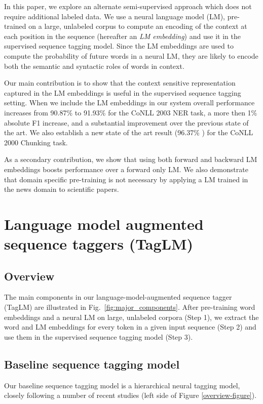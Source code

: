 \documentclass[11pt,a4paper]{article}
\begin{document}
In this paper, we explore an alternate semi-supervised approach which does not require additional labeled data.
We use a neural language model (LM), pre-trained on a large, unlabeled corpus to compute an encoding of the context at each position in the sequence (hereafter an \textit{LM embedding}) and use it in the supervised sequence tagging model.
Since the LM embeddings are used to compute the probability of future words in a neural LM, they are likely to encode both the semantic and syntactic roles of words in context.


Our main contribution is to show that the context sensitive
representation captured in the LM embeddings is useful in the
supervised sequence tagging setting.
When we include the LM embeddings in our system overall performance increases from 90.87\% to 91.93\%  for the CoNLL 2003 NER task, a more then 1\% absolute F1 increase,
and a substantial improvement over the previous state of the art.
We also establish
a new state of the art result (96.37\% ) for the CoNLL 2000 Chunking task.

As a secondary contribution, we show that using both forward and backward LM embeddings boosts performance over a forward only LM. We also demonstrate that domain specific pre-training is not necessary by applying a LM trained in the news domain to scientific papers.





\section{Language model augmented sequence taggers (TagLM)}


\subsection{Overview}
The main components in our language-model-augmented sequence tagger (TagLM) are illustrated in Fig.~\ref{fig:major_components}. 
After pre-training word embeddings and a neural LM on large, unlabeled corpora (Step 1), we extract the word and LM embeddings for every token in a given input sequence (Step 2)
and use them in the supervised sequence tagging model (Step 3).






\subsection{Baseline sequence tagging model}
\label{sec:baseline}
Our baseline sequence tagging model is a hierarchical neural tagging model, closely following a number of recent
studies \citep{Ma2016EndtoendSL,lample-EtAl:2016:N16-1,yang-transfer-iclr07,chiu-nichols-2016} (left side of Figure \ref{overview-figure}).
\end{document}

